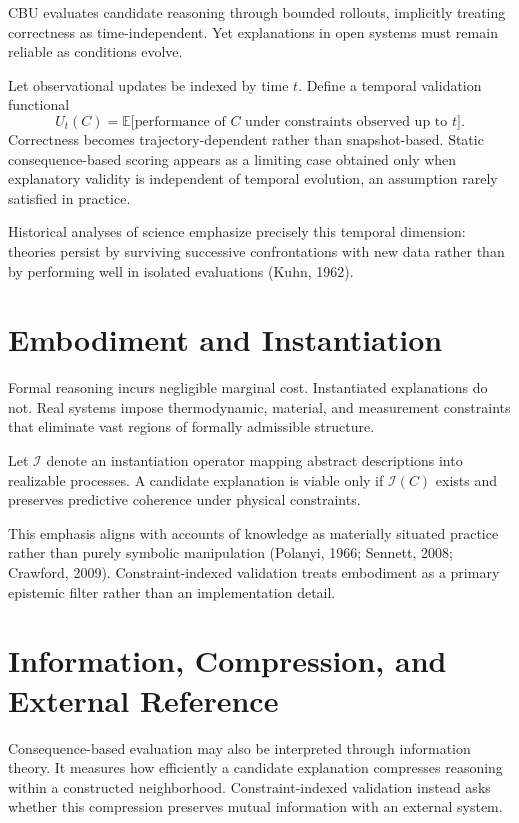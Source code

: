 \documentclass[12pt]{article}
\begin{document}
CBU evaluates candidate reasoning through bounded rollouts, implicitly treating correctness as time-independent. Yet explanations in open systems must remain reliable as conditions evolve.

Let observational updates be indexed by time \(t\). Define a temporal validation functional
\[
U_t(C) = \mathbb{E}\bigl[\text{performance of } C \text{ under constraints observed up to } t\bigr].
\]
Correctness becomes trajectory-dependent rather than snapshot-based. Static consequence-based scoring appears as a limiting case obtained only when explanatory validity is independent of temporal evolution, an assumption rarely satisfied in practice.

Historical analyses of science emphasize precisely this temporal dimension: theories persist by surviving successive confrontations with new data rather than by performing well in isolated evaluations (Kuhn, 1962).

\section{Embodiment and Instantiation}

Formal reasoning incurs negligible marginal cost. Instantiated explanations do not. Real systems impose thermodynamic, material, and measurement constraints that eliminate vast regions of formally admissible structure.

Let \(\mathcal{I}\) denote an instantiation operator mapping abstract descriptions into realizable processes. A candidate explanation is viable only if \(\mathcal{I}(C)\) exists and preserves predictive coherence under physical constraints.

This emphasis aligns with accounts of knowledge as materially situated practice rather than purely symbolic manipulation (Polanyi, 1966; Sennett, 2008; Crawford, 2009). Constraint-indexed validation treats embodiment as a primary epistemic filter rather than an implementation detail.

\section{Information, Compression, and External Reference}

Consequence-based evaluation may also be interpreted through information theory. It measures how efficiently a candidate explanation compresses reasoning within a constructed neighborhood. Constraint-indexed validation instead asks whether this compression preserves mutual information with an external system.
\end{document}
